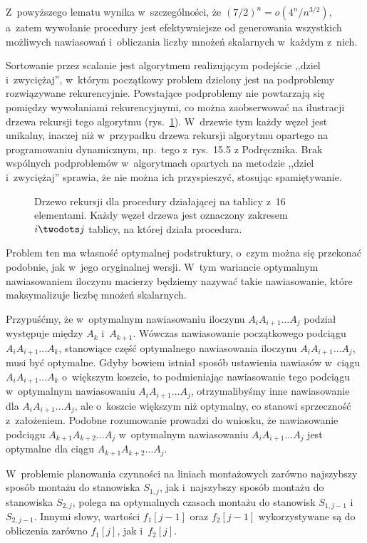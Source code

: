 Z~powyższego lematu wynika w~szczególności, że $(7/2)^n=o(4^n\!/n^{3/2})$, a~zatem wywołanie procedury  jest efektywniejsze od generowania wszystkich możliwych nawiasowań i~obliczania liczby mnożeń skalarnych w~każdym z~nich.

\exercise %
Sortowanie przez scalanie jest algorytmem realizującym podejście ,,dziel i~zwyciężaj'', w~którym początkowy problem dzielony jest na podproblemy rozwiązywane rekurencyjnie.
Powstające podproblemy nie powtarzają się pomiędzy wywołaniami rekurencyjnymi, co można zaobserwować na ilustracji drzewa rekursji tego algorytmu (rys.\ \ref{fig:15.3-2}).
W~drzewie tym każdy węzeł jest unikalny, inaczej niż w~przypadku drzewa rekursji algorytmu opartego na programowaniu dynamicznym, np.\ tego z~rys.\ 15.5 z Podręcznika.
Brak wspólnych podproblemów w~algorytmach opartych na metodzie ,,dziel i~zwyciężaj'' sprawia, że nie można ich przyspieszyć, stosując spamiętywanie.
\begin{figure}[!ht]
	\centering 
	\caption{Drzewo rekursji dla procedury  działającej na tablicy z~16 elementami.
Każdy węzeł drzewa jest oznaczony zakresem $i\twodots j$ tablicy, na której działa procedura.} \label{fig:15.3-2}
\end{figure}

\exercise %
Problem ten ma własność optymalnej podstruktury, o~czym można się przekonać podobnie, jak w~jego oryginalnej wersji.
W~tym wariancie optymalnym nawiasowaniem iloczynu macierzy będziemy nazywać takie nawiasowanie, które maksymalizuje liczbę mnożeń skalarnych.

Przypuśćmy, że w~optymalnym nawiasowaniu iloczynu $A_iA_{i+1}\dots A_j$ podział występuje między $A_k$ i~$A_{k+1}$.
Wówczas nawiasowanie początkowego podciągu $A_iA_{i+1}\dots A_k$, stanowiące część optymalnego nawiasowania iloczynu $A_iA_{i+1}\dots A_j$, musi być optymalne.
Gdyby bowiem istniał sposób ustawienia nawiasów w~ciągu $A_iA_{i+1}\dots A_k$ o~większym koszcie, to podmieniając nawiasowanie tego podciągu w~optymalnym nawiasowaniu $A_iA_{i+1}\dots A_j$, otrzymalibyśmy inne nawiasowanie dla $A_iA_{i+1}\dots A_j$, ale o~koszcie większym niż optymalny, co stanowi sprzeczność z~założeniem.
Podobne rozumowanie prowadzi do wniosku, że nawiasowanie podciągu $A_{k+1}A_{k+2}\dots A_j$ w~optymalnym nawiasowaniu $A_iA_{i+1}\dots A_j$ jest optymalne dla ciągu $A_{k+1}A_{k+2}\dots A_j$.

\exercise %
W~problemie planowania czynności na liniach montażowych zarówno najszybszy sposób montażu do stanowiska $S_{1,j}$, jak i~najszybszy sposób montażu do stanowiska $S_{2,j}$, polega na optymalnych czasach montażu do stanowisk $S_{1,j-1}$ i~$S_{2,j-1}$.
Innymi słowy, wartości $f_1[j-1]$ oraz $f_2[j-1]$ wykorzystywane są do obliczenia zarówno $f_1[j]$, jak i~$f_2[j]$.

